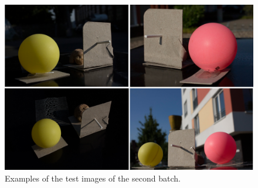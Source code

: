 \begin{figure}[H] 
	\center 
	\includegraphics[width=12cm]{Images/batch2.jpg}			
	\caption[Examples of the test images of the second Batch.]{Examples of the test images of the second batch.}
	\label{fig:batch2}
\end{figure}

\newpage
